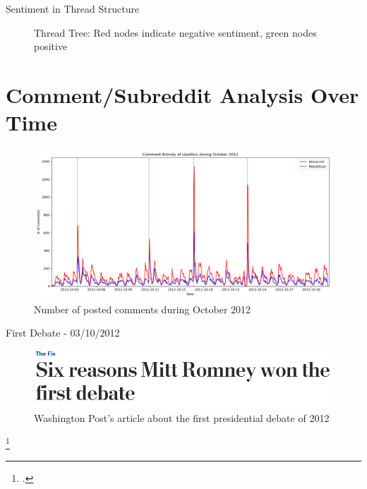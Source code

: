 \documentclass[aspectratio=169,notes]{beamer}
\begin{document}
\begin{frame}{Sentiment in Thread Structure}
\begin{figure}[htp]
\centering
{}
\caption{Thread Tree: Red nodes indicate negative sentiment, green nodes positive}
\end{figure}
\end{frame}

\section{Comment/Subreddit Analysis Over Time}

\begin{frame}
 \begin{figure}[htp]
 \centering
 \includegraphics[width=\linewidth]{comment_activity.png}
 \caption{Number of posted comments during October 2012}
\end{figure}
\end{frame}

\begin{frame}{First Debate - 03/10/2012}
 \begin{figure}[htp]
 \centering
 \includegraphics[width=\linewidth]{first_debate.png}
 \caption{Washington Post's article about the first presidential debate of 2012\footnotemark}
\end{figure}
\footcitetext{first_debate}
\end{frame}
\end{document}
